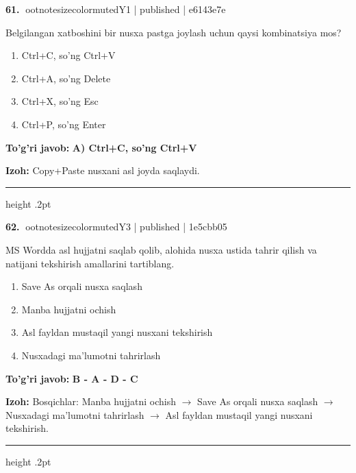 \documentclass[10pt,a4paper]{article}
\begin{document}
\textbf{\color{ink}61.} {ootnotesizecolor{muted}Y1 | published | e6143e7e}
\par
Belgilangan xatboshini bir nusxa pastga joylash uchun qaysi kombinatsiya mos?
\begin{enumerate}[label=\Alph*),leftmargin=9mm]
\item Ctrl+C, so'ng Ctrl+V
\item Ctrl+A, so'ng Delete
\item Ctrl+X, so'ng Esc
\item Ctrl+P, so'ng Enter
\end{enumerate}
\begin{tcolorbox}[enhanced,breakable,colback=teal!4,colframe=teal!55!black,boxrule=0.45pt,arc=1.2mm,left=2.8mm,right=2.8mm,top=2mm,bottom=2mm]
\textbf{\color{teal}To'g'ri javob:} \textbf{A) Ctrl+C, so'ng Ctrl+V}
\par\smallskip
\textbf{Izoh:} Copy+Paste nusxani asl joyda saqlaydi.
\end{tcolorbox}
\vspace{2mm}\hrule height .2pt\vspace{2mm}

\textbf{\color{ink}62.} {ootnotesizecolor{muted}Y3 | published | 1e5cbb05}
\par
MS Wordda asl hujjatni saqlab qolib, alohida nusxa ustida tahrir qilish va natijani tekshirish amallarini tartiblang.
\begin{enumerate}[label=\Alph*),leftmargin=9mm]
\item Save As orqali nusxa saqlash
\item Manba hujjatni ochish
\item Asl fayldan mustaqil yangi nusxani tekshirish
\item Nusxadagi ma'lumotni tahrirlash
\end{enumerate}
\begin{tcolorbox}[enhanced,breakable,colback=teal!4,colframe=teal!55!black,boxrule=0.45pt,arc=1.2mm,left=2.8mm,right=2.8mm,top=2mm,bottom=2mm]
\textbf{\color{teal}To'g'ri javob:} \textbf{B - A - D - C}
\par\smallskip
\textbf{Izoh:} Bosqichlar: Manba hujjatni ochish \ensuremath{\rightarrow} Save As orqali nusxa saqlash \ensuremath{\rightarrow} Nusxadagi ma'lumotni tahrirlash \ensuremath{\rightarrow} Asl fayldan mustaqil yangi nusxani tekshirish.
\end{tcolorbox}
\vspace{2mm}\hrule height .2pt\vspace{2mm}
\end{document}
